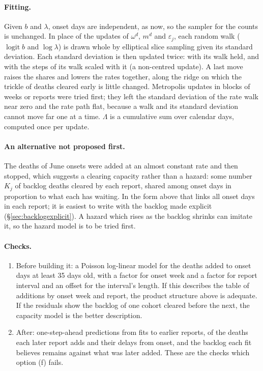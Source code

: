 \documentclass[11pt,a4paper]{article}
\begin{document}
\paragraph{Fitting.} Given $b$ and $\lambda$, onset days are independent, as
now, so the sampler for the counts is unchanged. In place of the updates of
$\omega^{d}$, $m^{d}$ and $\varepsilon_j$, each random walk ($\operatorname{logit}b$
and $\log\lambda$) is drawn whole by elliptical slice sampling given its
standard deviation. Each standard deviation is then updated twice: with its
walk held, and with the steps of its walk scaled with it (a non-centred
update). A last move raises the shares and lowers the rates together, along
the ridge on which the trickle of deaths cleared early is little changed.
Metropolis updates in blocks of weeks or reports were tried first; they left
the standard deviation of the rate walk near zero and the rate path flat,
because a walk and its standard deviation cannot move far one at a time.
$\Lambda$ is a cumulative sum over calendar days, computed once per update.

\paragraph{An alternative not proposed first.} The deaths of June onsets
were added at an almost constant rate and then stopped, which suggests a
clearing capacity rather than a hazard: some number $K_j$ of backlog deaths
cleared by each report, shared among onset days in proportion to what each
has waiting. In the form above that links all onset days in each report;
it is easiest to write with the backlog made explicit
(\S\ref{sec:backlogexplicit}). A hazard which rises as the backlog shrinks
can imitate it, so the hazard model is to be tried first.

\paragraph{Checks.}
\begin{enumerate}
\item Before building it: a Poisson log-linear model for the deaths added to
onset days at least 35 days old, with a factor for onset week and a factor
for report interval and an offset for the interval's length. If this
describes the table of additions by onset week and report, the product
structure above is adequate. If the residuals show the backlog of one cohort
cleared before the next, the capacity model is the better description.
\item After: one-step-ahead predictions from fits to earlier reports, of the
deaths each later report adds and their delays from onset, and the backlog
each fit believes remains against what was later added. These are the
checks which option (f) fails.
\end{enumerate}
\end{document}
